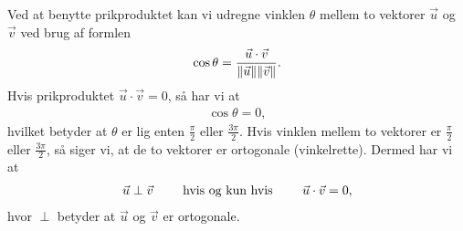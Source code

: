 Ved at benytte prikproduktet kan vi udregne vinklen $\theta$ mellem to vektorer $\vec{u}$ og $\vec{v}$ ved brug af formlen 
\begin{align}\label{eq:vec3d1vinkelvedprikprodukt}
\cos \theta = \frac{\vec{u} \cdot \vec{v}}{\Vert \vec{u}\Vert \Vert \vec{v}\Vert}.
\end{align}
Hvis prikproduktet $\vec{u} \cdot \vec{v}=0$, så har vi at 
\begin{align*}
\cos \theta = 0,
\end{align*}
hvilket betyder at $\theta$ er lig enten $\frac{\pi}{2}$ eller $\frac{3\pi}{2}$. Hvis vinklen mellem to vektorer er $\frac{\pi}{2}$ eller $\frac{3\pi}{2}$, så siger vi, at de to vektorer er ortogonale (vinkelrette). Dermed har vi at 
\begin{align*}
\vec{u} \perp \vec{v} \qquad \textup{ hvis og kun hvis } \qquad \vec{u} \cdot \vec{v} = 0,
\end{align*}
hvor $\perp$ betyder at $\vec{u}$ og $\vec{v}$ er ortogonale.

